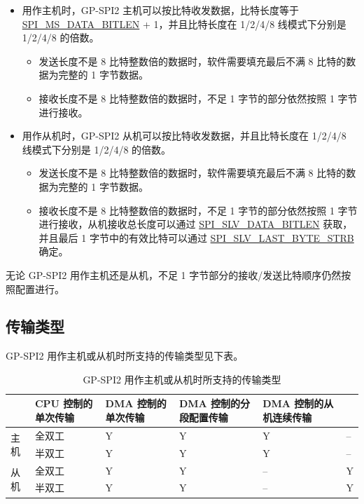 \documentclass[main\_\_CN.tex]{subfiles}
\begin{document}
\begin{itemize}
    \item 用作主机时，GP-SPI2 主机可以按比特收发数据，比特长度等于   \hyperref[fielddesc:SPIMSDATABITLEN]{SPI\_MS\_DATA\_BITLEN} + 1，并且比特长度在 1/2/4/8 线模式下分别是 1/2/4/8 的倍数。%
    \begin{itemize}
        \item 发送长度不是 8 比特整数倍的数据时，软件需要填充最后不满 8 比特的数据为完整的 1 字节数据。
        \item 接收长度不是 8 比特整数倍的数据时，不足 1 字节的部分依然按照 1 字节进行接收。
    \end{itemize}
    \item 用作从机时，GP-SPI2 从机可以按比特收发数据，并且比特长度在 1/2/4/8 线模式下分别是 1/2/4/8 的倍数。
    \begin{itemize}
        \item 发送长度不是 8 比特整数倍的数据时，软件需要填充最后不满 8 比特的数据为完整的 1 字节数据。
        \item 接收长度不是 8 比特整数倍的数据时，不足 1 字节的部分依然按照 1 字节进行接收，从机接收总长度可以通过  \hyperref[fielddesc:SPISLVDATABITLEN]{SPI\_SLV\_DATA\_BITLEN} 获取，并且最后 1 字节中的有效比特可以通过 \hyperref[fielddesc:SPISLVLASTBYTESTRB]{SPI\_SLV\_LAST\_BYTE\_STRB} 确定。
    \end{itemize}
\end{itemize}
\begin{tiplisting}
无论 GP-SPI2 用作主机还是从机，不足 1 字节部分的接收/发送比特顺序仍然按照配置进行。
\end{tiplisting}

\subsection{传输类型}

GP-SPI2 用作主机或从机时所支持的传输类型见下表。

\begin{table}[H]
    \centering
    \caption{GP-SPI2 用作主机或从机时所支持的传输类型}
    \label{tab:transfer-modes}
    \begin{threeparttable}
    \begin{tabular}{|l|l|p{2.3cm}<{\centering}|p{2.3cm}<{\centering}|p{3.3cm}<{\centering}|p{3.3cm}<{\centering}| }
    \hline
        \rowcolor{lightgray}
       \multicolumn{2}{l|}{\textbf{模式}}  & \textbf{CPU 控制的单次传输}  & \textbf{DMA 控制的单次传输} &   \textbf{DMA 控制的分段配置传输}    & \textbf{DMA 控制的从机连续传输} \\\hline
    \multirow{2}{*}{主机} & 全双工 & Y & Y & Y & --\\\cline{2-6}

    & 半双工 & Y & Y & Y & --\\\hline

    \multirow{2}{*}{从机} & 全双工 & Y & Y & -- &Y \\\cline{2-6}
    & 半双工 & Y & Y & -- &Y \\\hline
        \end{tabular}
     \end{threeparttable}
    \end{table}
\end{document}

